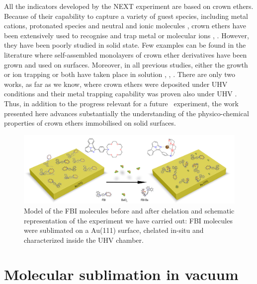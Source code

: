 \documentclass[aps,prl,reprint,longbibliography,superscriptaddress, english]{revtex4-1}
\begin{document}
All the indicators developed by the NEXT experiment are based on crown ethers. Because of their capability to capture a variety of guest species, including metal cations, protonated species and neutral and ionic molecules \cite{dobler1981ionophores}, crown ethers \cite{gokel_crown_1991} have been extensively used to recognise and trap metal or molecular ions \cite{more_intrinsic_1999}, \cite{maleknia_cavity-size-dependent_2002}. However, they have been poorly studied in solid state. Few examples can be found in the literature where self-assembled monolayers of crown ether derivatives have been grown and used on surfaces. Moreover, in all previous studies, either the growth or ion trapping or both have taken place in solution \cite{yoshimoto_hostguest_2003}, \cite{flink_recognition_1999}, \cite{inokuchi_new_2015}. 
 There are only two works, as far as we know, where crown ethers were deposited under UHV conditions \cite{feng_growth_2018} and their metal trapping capability was proven also under UHV \cite{stredansky_-surface_2019}. Thus, in addition to the progress relevant for a future \bbonu\ experiment, the work presented here advances substantially the understanding of the physico-chemical properties of crown ethers immobilised on solid surfaces. 
 

 \begin{figure}[ht!]
	\includegraphics[width=1\textwidth]{figures/figura_1a.jpg}
	\caption{\label{ModeloFBI} 
    Model of the FBI molecules before and after chelation and schematic representation of the experiment we have carried out: FBI molecules were sublimated on a Au(111) surface, chelated in-situ and characterized inside the UHV chamber.}
\end{figure}  


\section{Molecular sublimation in vacuum}
\end{document}
